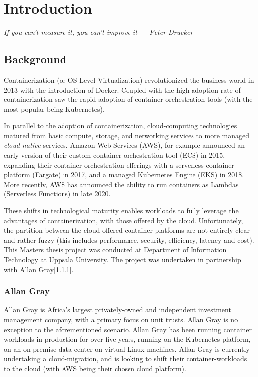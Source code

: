 \chapter{Introduction}
\label{sec:intro}
\textit{If you can't measure it, you can't improve it --- Peter Drucker}

\section{Background}
Containerization (or OS-Level Virtualization) revolutionized the business world in 2013\cite{virtualization} with the introduction of Docker\cite{docker_usage}.
Coupled with the high adoption rate of containerization saw the rapid adoption of container-orchestration tools (with the most popular being Kubernetes\cite{k8s}).

In parallel to the adoption of containerization, cloud-computing technologies matured from basic compute, storage,
and networking services\cite{barr_2009} to more managed \textit{cloud-native} services. Amazon Web Services (AWS),
for example announced an early version of their custom container-orchestration tool (ECS) in 2015\cite{ecs},
expanding their container-orchestration offerings with a serverless container platform (Fargate) in 2017\cite{fargate},
and a managed Kubernetes Engine (EKS) in 2018\cite{eks}.
More recently, AWS has announced the ability to run containers as Lambdas (Serverless Functions) in late 2020\cite{lambda}.

\noindent These shifts in technological maturity enables workloads to fully leverage the advantages of containerization, 
with those offered by the cloud.
Unfortunately, the partition between the cloud offered container platforms are not entirely clear and rather fuzzy
(this includes performance, security, efficiency, latency and cost).\\

\noindent This Masters thesis project was conducted at Department of Information Technology at Uppsala University.
The project was undertaken in partnership with Allan Gray[\ref{sec:allan_gray}].

\subsection{Allan Gray}
\label{sec:allan_gray}
Allan Gray\cite{allan_gray} is Africa's largest privately-owned and independent investment management company, with a primary focus on unit trusts.
Allan Gray is no exception to the aforementioned scenario. Allan Gray has been running container workloads in production for over five years,
running on the Kubernetes platform, on an on-premise data-center on virtual Linux machines.
Allan Gray is currently undertaking a cloud-migration, and is looking to shift their container-workloads to the cloud (with AWS being their chosen cloud platform).

